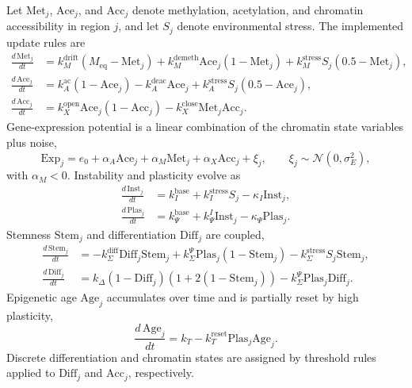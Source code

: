 \documentclass[12pt,a4paper]{article}
\begin{document}
Let $\mathrm{Met}_j$, $\mathrm{Ace}_j$, and $\mathrm{Acc}_j$ denote methylation, acetylation, and chromatin accessibility in region $j$, and let $S_j$ denote environmental stress. The implemented update rules are
\begin{align}
\frac{d\,\mathrm{Met}_j}{dt} &= k_{M}^{\mathrm{drift}}(M_{\mathrm{eq}} - \mathrm{Met}_j) + k_{M}^{\mathrm{demeth}} \mathrm{Ace}_j (1 - \mathrm{Met}_j) + k_{M}^{\mathrm{stress}} S_j (0.5 - \mathrm{Met}_j), \\
\frac{d\,\mathrm{Ace}_j}{dt} &= k_A^{\mathrm{ac}}(1 - \mathrm{Ace}_j) - k_A^{\mathrm{deac}} \mathrm{Ace}_j + k_A^{\mathrm{stress}} S_j (0.5 - \mathrm{Ace}_j), \\
\frac{d\,\mathrm{Acc}_j}{dt} &= k_X^{\mathrm{open}} \mathrm{Ace}_j (1 - \mathrm{Acc}_j) - k_X^{\mathrm{close}} \mathrm{Met}_j \mathrm{Acc}_j.
\end{align}
Gene-expression potential is a linear combination of the chromatin state variables plus noise,
\begin{equation}
\mathrm{Exp}_j = e_0 + \alpha_A \mathrm{Ace}_j + \alpha_M \mathrm{Met}_j + \alpha_X \mathrm{Acc}_j + \xi_j, \qquad \xi_j \sim \mathcal{N}(0, \sigma_E^2),
\end{equation}
with $\alpha_M < 0$. Instability and plasticity evolve as
\begin{align}
\frac{d\,\mathrm{Inst}_j}{dt} &= k_I^{\mathrm{base}} + k_I^{\mathrm{stress}} S_j - \kappa_I \mathrm{Inst}_j, \\
\frac{d\,\mathrm{Plas}_j}{dt} &= k_\Psi^{\mathrm{base}} + k_\Psi^{I} \mathrm{Inst}_j - \kappa_\Psi \mathrm{Plas}_j.
\end{align}
Stemness $\mathrm{Stem}_j$ and differentiation $\mathrm{Diff}_j$ are coupled,
\begin{align}
\frac{d\,\mathrm{Stem}_j}{dt} &= -k_{\Sigma}^{\mathrm{diff}} \mathrm{Diff}_j \mathrm{Stem}_j + k_{\Sigma}^{\Psi} \mathrm{Plas}_j (1 - \mathrm{Stem}_j) - k_{\Sigma}^{\mathrm{stress}} S_j \mathrm{Stem}_j, \\
\frac{d\,\mathrm{Diff}_j}{dt} &= k_\Delta (1 - \mathrm{Diff}_j)(1 + 2(1 - \mathrm{Stem}_j)) - k_{\Sigma}^{\Psi} \mathrm{Plas}_j \mathrm{Diff}_j.
\end{align}
Epigenetic age $\mathrm{Age}_j$ accumulates over time and is partially reset by high plasticity,
\begin{equation}
\frac{d\,\mathrm{Age}_j}{dt} = k_T - k_T^{\mathrm{reset}} \mathrm{Plas}_j \mathrm{Age}_j.
\end{equation}
Discrete differentiation and chromatin states are assigned by threshold rules applied to $\mathrm{Diff}_j$ and $\mathrm{Acc}_j$, respectively.
\end{document}
